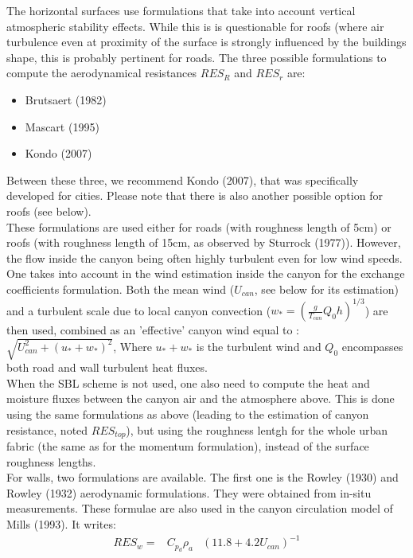The horizontal surfaces use formulations that take into account vertical atmospheric stability effects. While this is is questionable for roofs (where air turbulence even at proximity of the surface is strongly influenced by the buildings shape, this is probably pertinent for roads. The three possible formulations to compute the aerodynamical resistances $RES_{R}$ and $RES_{r}$ are: \\
\begin{itemize}
\item Brutsaert (1982) \nocite{Brutsaert1982}
\item Mascart \etal (1995)\nocite{Mascart1995}
\item Kondo \etal  (2007)\nocite{Kondo2007}
\end{itemize}
Between these three, we recommend Kondo \etal (2007), that was specifically developed for cities.
Please note that there is also another possible option for roofs (see below). \\

These formulations are used either for roads (with roughness length of 5cm) or roofs (with roughness length of 15cm, as observed by Sturrock \etal (1977)\nocite{Sturrock1977}). However, the flow inside the canyon being often highly turbulent even for low wind speeds. One takes into account in the wind estimation inside the canyon for the exchange coefficients formulation. Both the mean wind ($U_{can}$, see below for its estimation) and a turbulent scale due to local canyon convection ($w_*=\left ( \frac{g}{T_{can}}Q_{0}h \right )^{1/3}$) are then used, combined as an 'effective' canyon wind equal to : $\sqrt{U_{can}^2+(u_{*}+w_{*})^2}$, Where $u_{*}+w_{*}$ is the turbulent wind and $Q_{0}$ encompasses both road and wall turbulent heat fluxes. \\

When the SBL scheme is not used, one also need to compute the heat and moisture fluxes between the canyon air and the atmosphere above. This is done using the same formulations as above (leading to the estimation of canyon resistance, noted $RES_{top}$), but using the roughness lentgh for the whole urban fabric (the same as for the momentum formulation), instead of the surface roughness lengths.\\

For walls, two formulations are available. The first one is  the Rowley \etal (1930)\nocite{Rowley1930} and Rowley \etal (1932)\nocite{Rowley1932} aerodynamic formulations. They were obtained from in-situ measurements. These formulae are also used in the canyon circulation model of Mills (1993). It writes:
\begin{eqnarray}
RES_{w} = & C_{p_d} \rho_a &  \left(11.8 + 4.2 U_{can}\right)^{-1}
\end{eqnarray}


